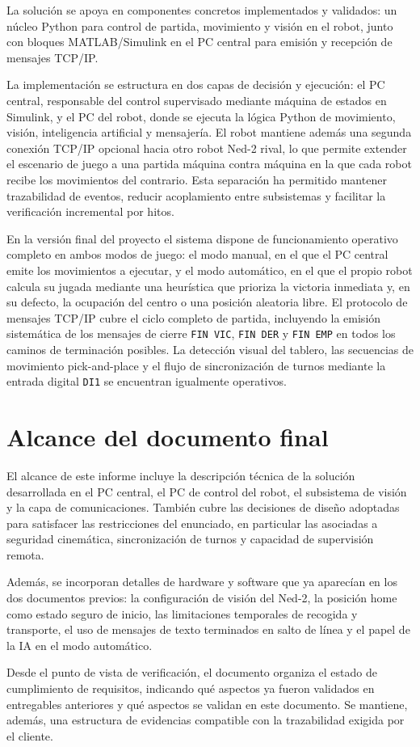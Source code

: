 \documentclass[12pt,a4paper]{article}
\begin{document}
La solución se apoya en componentes concretos implementados y validados: un núcleo Python para control de partida, movimiento y visión en el robot, junto con bloques MATLAB/Simulink en el PC central para emisión y recepción de mensajes TCP/IP.
\par
La implementación se estructura en dos capas de decisión y ejecución: el PC central, responsable del control supervisado mediante máquina de estados en Simulink, y el PC del robot, donde se ejecuta la lógica Python de movimiento, visión, inteligencia artificial y mensajería. El robot mantiene además una segunda conexión TCP/IP opcional hacia otro robot Ned-2 rival, lo que permite extender el escenario de juego a una partida máquina contra máquina en la que cada robot recibe los movimientos del contrario. Esta separación ha permitido mantener trazabilidad de eventos, reducir acoplamiento entre subsistemas y facilitar la verificación incremental por hitos.
\par
En la versión final del proyecto el sistema dispone de funcionamiento operativo completo en ambos modos de juego: el modo manual, en el que el PC central emite los movimientos a ejecutar, y el modo automático, en el que el propio robot calcula su jugada mediante una heurística que prioriza la victoria inmediata y, en su defecto, la ocupación del centro o una posición aleatoria libre. El protocolo de mensajes TCP/IP cubre el ciclo completo de partida, incluyendo la emisión sistemática de los mensajes de cierre \texttt{FIN VIC}, \texttt{FIN DER} y \texttt{FIN EMP} en todos los caminos de terminación posibles. La detección visual del tablero, las secuencias de movimiento pick-and-place y el flujo de sincronización de turnos mediante la entrada digital \texttt{DI1} se encuentran igualmente operativos.

\section{Alcance del documento final}
El alcance de este informe incluye la descripción técnica de la solución desarrollada en el PC central, el PC de control del robot, el subsistema de visión y la capa de comunicaciones. También cubre las decisiones de diseño adoptadas para satisfacer las restricciones del enunciado, en particular las asociadas a seguridad cinemática, sincronización de turnos y capacidad de supervisión remota.

Además, se incorporan detalles de hardware y software que ya aparecían en los dos documentos previos: la configuración de visión del Ned-2, la posición home como estado seguro de inicio, las limitaciones temporales de recogida y transporte, el uso de mensajes de texto terminados en salto de línea y el papel de la IA en el modo automático.
\par
Desde el punto de vista de verificación, el documento organiza el estado de cumplimiento de requisitos, indicando qué aspectos ya fueron validados en entregables anteriores y qué aspectos se validan en este documento. Se mantiene, además, una estructura de evidencias compatible con la trazabilidad exigida por el cliente.
\end{document}
